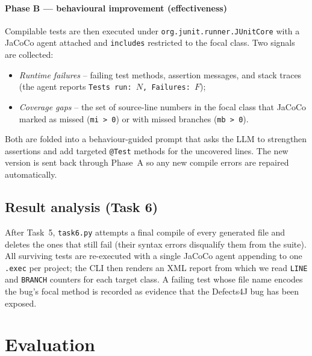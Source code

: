 \documentclass[conference]{IEEEtran}
\begin{document}
\paragraph{Phase B — behavioural improvement (effectiveness)}
Compilable tests are then executed under
\texttt{org.junit.runner.JUnitCore} with a JaCoCo agent attached and
\texttt{includes} restricted to the focal class. Two signals are
collected:
\begin{itemize}
  \item \textit{Runtime failures} -- failing test methods, assertion
        messages, and stack traces (the agent reports
        \texttt{Tests run: $N$, Failures: $F$});
  \item \textit{Coverage gaps} -- the set of source-line numbers in
        the focal class that JaCoCo marked as missed
        (\texttt{mi > 0}) or with missed branches (\texttt{mb > 0}).
\end{itemize}
Both are folded into a behaviour-guided prompt that asks the LLM to
strengthen assertions and add targeted \texttt{@Test} methods for the
uncovered lines. The new version is sent back through Phase~A so any
new compile errors are repaired automatically.

\subsection{Result analysis (Task 6)}
After Task~5, \texttt{task6.py} attempts a final compile of every
generated file and deletes the ones that still fail (their syntax
errors disqualify them from the suite). All surviving tests are
re-executed with a single JaCoCo agent appending to one
\texttt{.exec} per project; the CLI then renders an XML report from
which we read \texttt{LINE} and \texttt{BRANCH} counters for each
target class. A failing test whose file name encodes the bug's focal
method is recorded as evidence that the Defects4J bug has been
exposed.

\section{Evaluation}
\label{sec:evaluation}
\end{document}
